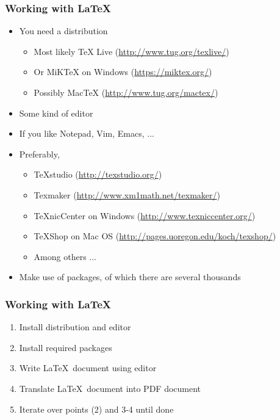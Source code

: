 \documentclass{beamer}
\begin{document}
\begin{frame}
  \frametitle{Working with \LaTeX}
	
  \begin{itemize}
    \item You need a distribution
    \begin{itemize}
      \item Most likely TeX Live (\url{http://www.tug.org/texlive/})
      \item Or MiKTeX on Windows (\url{https://miktex.org/})
      \item Possibly MacTeX (\url{http://www.tug.org/mactex/})
    \end{itemize}
    \item Some kind of editor
    \item If you like Notepad, Vim, Emacs, ...
    \item Preferably,
    \begin{itemize}
      \item TeXstudio (\url{http://texstudio.org/})
      \item Texmaker (\url{http://www.xm1math.net/texmaker/})
      \item TeXnicCenter on Windows (\url{http://www.texniccenter.org/})
      \item TeXShop on Mac OS (\url{http://pages.uoregon.edu/koch/texshop/})
      \item Among others ...
    \end{itemize}
    \item Make use of packages, of which there are several thousands
  \end{itemize}
\end{frame}

\begin{frame}
  \frametitle{Working with \LaTeX}
  
  \begin{enumerate}
    \item Install distribution and editor
    \item Install required packages
    \item Write \LaTeX~document using editor
    \item Translate \LaTeX~document into PDF document
    \item Iterate over points (2) and 3-4 until done
  \end{enumerate}
\end{frame}
\end{document}
